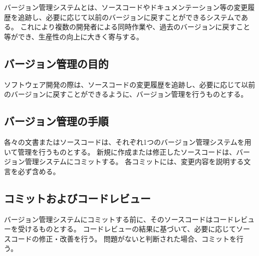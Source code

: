 \clearpage
バージョン管理システムとは、ソースコードやドキュメンテーション等の変更履歴を追跡し、必要に応じて以前のバージョンに戻すことができるシステムである。
これにより複数の開発者による同時作業や、過去のバージョンに戻すこと等ができ、生産性の向上に大きく寄与する。

\subsection{バージョン管理の目的}
ソフトウェア開発の際は、ソースコードの変更履歴を追跡し、必要に応じて以前のバージョンに戻すことができるように、バージョン管理を行うものとする。

\subsection{バージョン管理の手順}
各々の文書またはソースコードは、それぞれ1つのバージョン管理システムを用いて管理を行うものとする。
新規に作成または修正したソースコードは、バージョン管理システムにコミットする。
各コミットには、変更内容を説明する文言を必ず含める。

\subsection{コミットおよびコードレビュー}
バージョン管理システムにコミットする前に、そのソースコードはコードレビューを受けるものとする。
コードレビューの結果に基づいて、必要に応じてソースコードの修正・改善を行う。
問題がないと判断された場合、コミットを行う。

